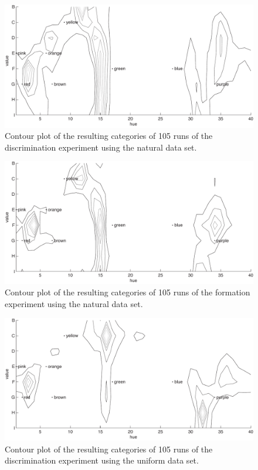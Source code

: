 \begin{figure}[htbp]
\centering
  \includegraphics[width=.85\textwidth]{./experiments/figures/contour-natural-no-language}
  \caption{Contour plot of the resulting categories of 105 runs of the
    discrimination experiment using the natural data set.}
\label{f:contour-natural-no-language}
\end{figure}

\begin{figure}[htbp]
\centering
  \includegraphics[width=.85\textwidth]{./experiments/figures/contour-natural-language}
  \caption{Contour plot of the resulting categories of 105 runs of the
    formation experiment using the natural data set.}
\label{f:contour-natural-language}
\end{figure}

\begin{figure}[htbp]
\centering
  \includegraphics[width=.85\textwidth]{./experiments/figures/contour-uniform-no-language}
  \caption{Contour plot of the resulting categories of 105 runs of the
    discrimination experiment using the uniform data set.}
\label{f:contour-uniform-no-language}
\end{figure}

